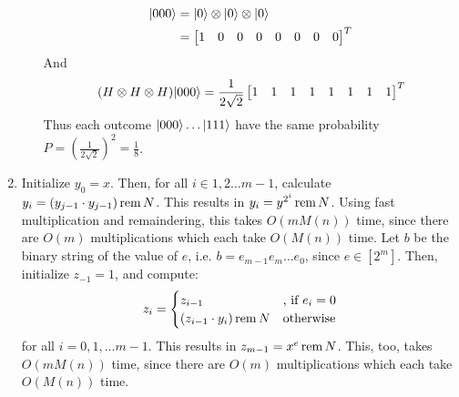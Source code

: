 \documentclass[11pt,a4paper]{article}
\begin{document}
\begin{enumerate}
\begin{enumerate}
                    \begin{align*}
                        |000\rangle & = |0\rangle \otimes |0\rangle \otimes |0\rangle \\
                                 & = \begin{bmatrix}
                                         1 & 0 & 0 & 0 & 0 & 0 & 0 & 0
                                     \end{bmatrix}^T
                    \end{align*}
                    And
                    \begin{align*}
                        (H \otimes H \otimes H)|000\rangle = \frac{1}{2\sqrt{2}} \begin{bmatrix}
                                                                                  1 & 1 & 1 & 1 & 1 & 1 & 1 & 1
                                                                              \end{bmatrix}^T
                    \end{align*}
                    Thus each outcome $|000\rangle \dots |111\rangle$ have the same probability $P = (\frac{1}{2\sqrt{2}})^2 = \frac{1}{8}$.
          \end{enumerate}
          \newpage
    \item Initialize $y_0 = x$. Then, for all $i \in 1, 2 \dots m - 1$, calculate \\ $y_i = (y_{j-1} \cdot y_{j-1}) \operatorname{rem}{N}$.
          This results in $y_i = y^{2^i} \operatorname{rem}{N}$. Using fast multiplication and remaindering, this takes $O(mM(n))$ time, since there are $O(m)$ multiplications which each take
          $O(M(n))$ time. Let $b$ be the binary string of the value of $e$, i.e. $b = e_{m-1} e_m \dots e_0$, since $e \in [2^m]$.
          Then, initialize $z_{-1} = 1$, and compute:
          \begin{align*}
              z_i = \begin{cases}
                        z_{i - 1}                     & \text{, if }  e_i = 0 \\
                        (z_{i - 1} \cdot y_i) \operatorname{rem}{N} & \text{otherwise}
                    \end{cases}
          \end{align*}
          for all $i = 0, 1, \dots m - 1$. This results in $z_{m - 1} = x^e \operatorname{rem}{N}$. This, too, takes $O(mM(n))$ time, since there are $O(m)$ multiplications which each take $O(M(n))$ time.
          \newpage
\end{enumerate}
\end{document}
